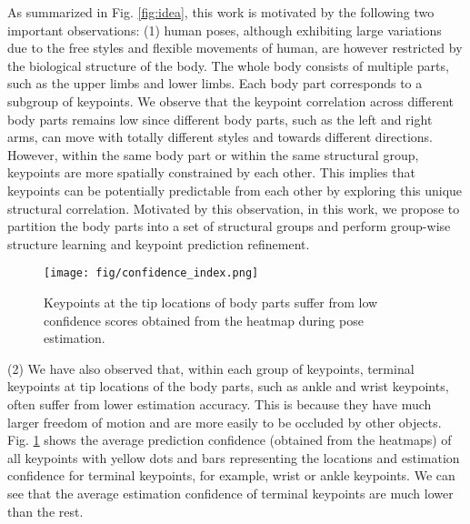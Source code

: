 \documentclass[runningheads]{llncs}
\begin{document}
 As summarized in Fig. \ref{fig:idea}, this work is motivated by the following two important observations: (1) human poses, although exhibiting large variations due to the free styles and flexible movements of human, are however restricted by the biological structure of the body. The whole body consists of multiple  parts, such as the upper limbs and lower limbs. Each body part corresponds to a subgroup of keypoints. We observe that the keypoint correlation across different body parts remains low since different body parts, such as the left and right arms, can move with totally different styles and towards different directions. However, within the same body part or within the same structural group, keypoints are more spatially constrained by each other. This implies that keypoints can be potentially predictable from each other by exploring this unique structural correlation. Motivated by this observation, in this work, we propose to partition the body parts into a set of structural groups and perform group-wise structure learning and keypoint prediction refinement. 

\begin{figure}[h]
\centering
\setlength{\abovecaptionskip}{-0.1cm} 
\setlength{\belowcaptionskip}{-0.4cm} 
\texttt{[image: fig/confidence\_index.png]}
\centering
\caption{Keypoints at the tip locations of body parts suffer from low confidence scores obtained from the heatmap during pose estimation.}
\label{fig:confidence}
\end{figure}

(2) We have also observed that, within each group of keypoints, terminal keypoints at tip locations of the body parts, such as 
ankle and wrist keypoints, often suffer from lower estimation accuracy. This is because they have much larger freedom of motion and are more easily to be occluded by other objects. Fig. \ref{fig:confidence} shows the average prediction confidence (obtained from the heatmaps) of all keypoints with yellow dots and bars representing the locations and estimation confidence for terminal keypoints, for example, wrist or ankle keypoints.  We can see that the average estimation confidence of terminal keypoints are much lower than the rest. 
\end{document}
